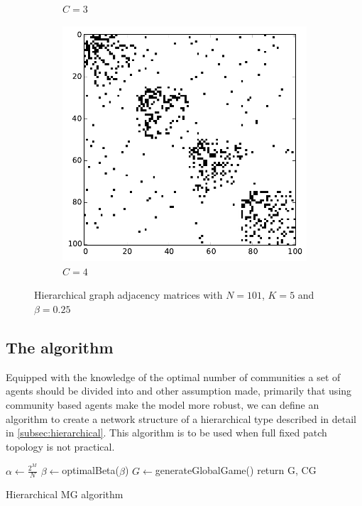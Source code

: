 \begin{figure}[h]
\begin{subfigure}[b]{0.3\textwidth}
                \caption{$C=3$}
        \end{subfigure}
        \begin{subfigure}[b]{0.3\textwidth}
        	\centering
                \includegraphics[width=\textwidth]{images/topology/hierarchical_adjacency_4_dot25.pdf}
                \caption{$C=4$}
        \end{subfigure}
        \caption{Hierarchical graph adjacency matrices with $N=101$, $K=5$ and $\beta =0.25$}
        \label{fig:hierarchical adjacency graph 0.25}
\end{figure}

\subsection{The algorithm}
\label{subsec:algorithm}

Equipped with the knowledge of the optimal number of communities a set of agents should be divided into and other assumption made, primarily that using community based agents make the model more robust, we can define an algorithm to create a network structure of a hierarchical type described in detail in \ref{subsec:hierarchical}.
This algorithm is to be used when full fixed patch topology is not practical.

\quad
\begin{algorithm}[H]
$\alpha \leftarrow \frac{2^M}{N}$\;
$\beta \leftarrow $optimalBeta($\beta$)\;
$G \leftarrow $generateGlobalGame()\;
return G, CG\;
\quad
\caption{Hierarchical MG algorithm}
\end{algorithm}
\quad


